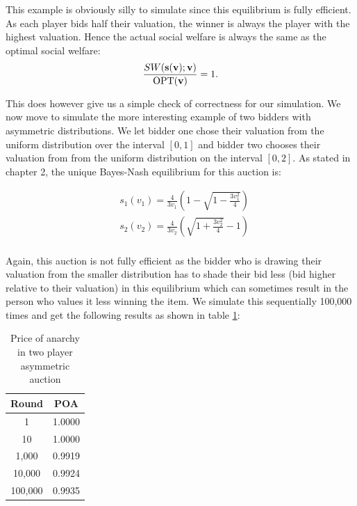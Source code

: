 \documentclass[12pt,twoside]{reedthesis}
\begin{document}
This example is obviously silly to simulate since this equilibrium is fully efficient. As each player bids half their valuation, the winner is always the player with the highest valuation. Hence the actual social welfare is always the same as the optimal social welfare: $$\frac{SW(\textbf{s}(\textbf{v}); \textbf{v})}{\text{OPT}(\textbf{v})} = 1.$$

This does however give us a simple check of correctness for our simulation. We now move to simulate the more interesting example of two bidders with asymmetric distributions. We let bidder one chose their valuation from the uniform distribution over the interval $[0,1]$ and bidder two chooses their valuation from from the uniform distribution on the interval $[0,2]$. As stated in chapter 2, the unique Bayes-Nash equilibrium for this auction is:

\begin{align*}
&s_1(v_1) = \frac{4}{3 v_1} \left(1 - \sqrt{1 - \frac{3v_1^2}{4}}\right)\\
&s_2(v_2) = \frac{4}{3 v_2} \left(\sqrt{1 + \frac{3v_2^2}{4}} - 1 \right)\\
\end{align*}

Again, this auction is not fully efficient as the bidder who is drawing their valuation from the smaller distribution has to shade their bid less (bid higher relative to their valuation) in this equilibrium which can sometimes result in the person who values it less winning the item. We simulate this sequentially 100,000 times and get the following results as shown in table \ref{table:2}:
\begin{table}[h!]
	\begin{center}
		\begin{tabular}{ |c|c| }
			\hline
			Round & POA \\
			\hline
			1 & 1.0000 \\
			10 & 1.0000 \\
			1,000 & 0.9919 \\
			10,000 & 0.9924 \\
			100,000 & 0.9935 \\
			\hline
		\end{tabular}
		\caption{Price of anarchy in two player asymmetric auction}
		\label{table:2}
	\end{center} 
\end{table}
\end{document}
